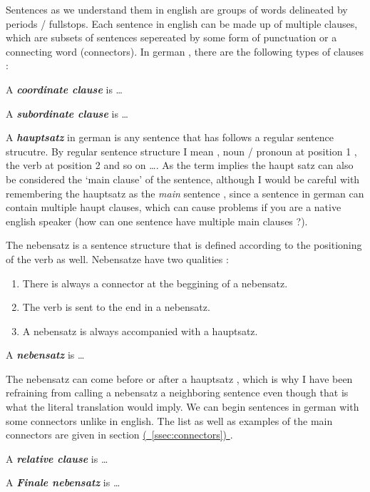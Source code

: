 \documentclass[a4paper,twocolumn,10pt]{article}
\newcommand{\newpar}
{\par \vspace{0.3cm}}
\newcommand{\subsectionend}
{
\nolinenumbers
\linenumbers
}
\newcommand{\refssec}[1]
{
	\hyperref[sec:#1]
	{
		(\textsection~\ref{ssec:#1})
	}
}
\begin{document}
Sentences as we understand them in english are groups of words delineated by
periods / fullstops. Each sentence in english can be made up of multiple
clauses, which are subsets of sentences sepereated by some form of punctuation
or a connecting word (connectors). In german , there are the following types of
clauses :\newpar

A \textbf{\textit{coordinate clause}} is \ldots \newpar

A \textbf{\textit{subordinate clause}} is \ldots \newpar

A \textbf{\textit{hauptsatz}} in german is any sentence that has follows a
regular sentence strucutre. By regular sentence structure I mean , noun /
pronoun at position 1 , the verb at position 2 and so on \ldots . As the term
implies the haupt satz can also be considered the `main clause' of the sentence,
although I would be careful with remembering the hauptsatz as the \textit{main}
sentence , since a sentence in german can contain multiple haupt clauses, which
can cause problems if you are a native english speaker (how can one sentence
have multiple main clauses ?).\newpar

The nebensatz is a sentence structure that is defined according to the
positioning of the verb as well. Nebensatze have two qualities :


\begin{enumerate}[noitemsep]
	\item There is always a connector at the beggining of a nebensatz.
	\item The verb is sent to the end in a nebensatz.
	\item A nebensatz is always accompanied with a hauptsatz.
\end{enumerate}


A \textbf{\textit{nebensatz}} is \ldots \newpar
The nebensatz can come before or after a hauptsatz , which is why I have been
refraining from calling a nebensatz a neighboring sentence even though that is
what the literal translation would imply. We can begin sentences in german with
some connectors unlike in english. The list as well as examples of the main
connectors are given in section \refssec{connectors}. \newpar


A \textbf{\textit{relative clause}} is \ldots \newpar

A \textbf{\textit{Finale nebensatz}} is \ldots \newpar
\subsectionend
\end{document}
